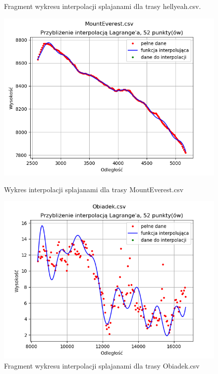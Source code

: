 \documentclass{article} %
\begin{document}
\begin{figure}[h!]
\begin{minipage}[b]{0.4\textwidth}
        \caption{Fragment wykresu interpolacji splajanami dla trasy hellyeah.csv.}
    \end{minipage}
    \begin{minipage}[b]{0.4\textwidth}
        \includegraphics[width=\textwidth]{lagrange/rozne_trasy/me_52_cale.png}
        \caption{Wykres interpolacji splajanami dla trasy MountEverest.csv}
    \end{minipage}
    \hfill
    \begin{minipage}[b]{0.4\textwidth}
        \includegraphics[width=\textwidth]{lagrange/rozne_trasy/obiadek_52_cale.png}
        \caption{Fragment wykresu interpolacji splajanami dla trasy Obiadek.csv}
    \end{minipage}

\end{figure}
\end{document}
